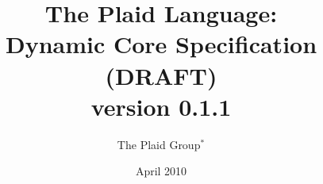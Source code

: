 \documentclass[12pt]{article}
\title{The Plaid Language:\\
Dynamic Core Specification (DRAFT)\\ %
\vspace{2ex}
version 0.1.1\\
\vspace{2ex}
}
\author{The Plaid Group$^{\ast}$
}
\date{April 2010}
\begin{document}
\renewcommand*{\thepage}{title-\arabic{page}} 
\maketitle
\renewcommand*{\thepage}{\arabic{page}} 







\end{document}
